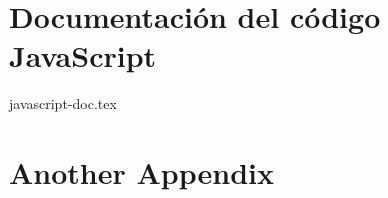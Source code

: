 \documentclass[twoside,openright,11pt]{report}
\begin{document}
\begin{comment}
\nocite{*}



\nocite{Gerald}
\nocite{Falconer}
\nocite{Hurewicz-Wallman}
\nocite{Wagon}
\nocite{Apuntes-AMI-Paya}
\nocite{Ostrowski}
\nocite{Atkinson}
\nocite{John-Milnor}

\nocite{agness-scott}
\nocite{Sandra-Snyder}
\nocite{Evan-Dummit}
\nocite{Bandt}
\nocite{Foroutan}
\nocite{cgdirector}
\nocite{computer-graphics}
\nocite{wikipedia-webgl}

\nocite{MDN-2}
\nocite{MDN-3}
\nocite{MDN-4}
\nocite{MDN-5}
\nocite{learn-opengl}
\nocite{khronos}
\nocite{HTML5rocks}
\nocite{renderingcontextdoc}



\defbibfilter{papers}{
  type=article or
  type=book or 
  type=misc or 
  type=inproceedings or 
  type=incollection or 
  type=report 
}

\printbibliography[
heading=bibintoc, filter=papers,
title={Libros y artículos}
] %

\printbibliography[
heading=bibintoc, type=online,
title={Enlaces a la web}
] %

\defbibfilter{multimedia}{
  type=image or
  type=video
}

\printbibliography[
heading=bibintoc, filter=multimedia,
title={Multimedia}
]

\end{comment}


\appendix
\cleardoublepage


\chapter{Documentación del código JavaScript}
\label{appendix:javascript}

{javascript-doc.tex}


\chapter{Another Appendix}
\end{document}
